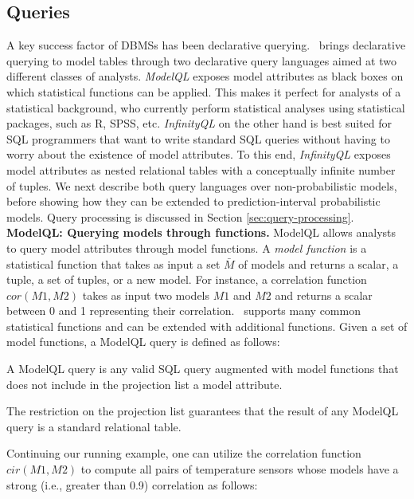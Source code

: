 \subsection{Queries}
\label{sec:queries}

A key success factor of DBMSs has been declarative querying. \projName\ brings declarative querying to model tables through two declarative query languages aimed at two different classes of analysts. \emph{ModelQL} exposes model attributes as black boxes on which statistical functions can be applied. This makes it perfect for analysts of a statistical background, who currently perform statistical analyses using statistical packages, such as R, SPSS, etc. \emph{InfinityQL} on the other hand is best suited for SQL programmers that want to write standard SQL queries without having to worry about the existence of model attributes. To this end, \emph{InfinityQL} exposes model attributes as nested relational tables with a conceptually infinite number of tuples. We next describe both query languages over non-probabilistic models, before showing how they can be extended to prediction-interval probabilistic models. Query processing is discussed in Section \ref{sec:query-processing}.\\

\textbf{ModelQL: Querying models through functions.} ModelQL allows analysts to query model attributes through model functions. A \emph{model function} is a statistical function that takes as input a set $\bar{M}$ of models and returns a scalar, a tuple, a set of tuples, or a new model. For instance, a correlation function $cor(M1, M2)$ takes as input two models $M1$ and $M2$ and returns a scalar between 0 and 1 representing their correlation.
\projName\ supports many common statistical functions and can be extended with additional functions. Given a set of model functions, a ModelQL query is defined as follows:

\begin{defin}
A ModelQL query is any valid SQL query augmented with model functions that does not include in the projection list a model attribute. 
\end{defin}

The restriction on the projection list guarantees that the result of any ModelQL query is a standard relational table.

\begin{example}
Continuing our running example, one can utilize the correlation function $cir(M1, M2)$ to compute all pairs of temperature sensors whose models have a strong (i.e., greater than 0.9) correlation as follows:\\

\end{example}

